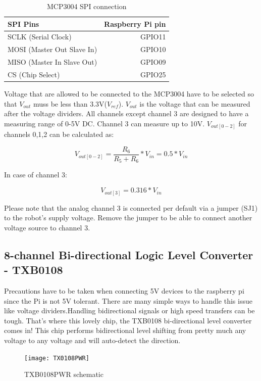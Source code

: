 \documentclass[
12pt, %
a4paper, %
oneside, %
headinclude,footinclude, %
BCOR5mm, %
table,
]{scrartcl}
\begin{document}
\begin{table}[H]
\centering
\begin{tabular}{lr}
\hline
SPI Pins & Raspberry Pi pin \\
\hline
SCLK (Serial Clock)        & GPIO11 \\
MOSI (Master Out Slave In) & GPIO10 \\
MISO (Master In Slave Out) & GPIO09 \\
CS   (Chip Select)         & GPIO25 \\
\hline
\end{tabular}
\label{tab:label}
\caption{MCP3004 SPI connection}
\end{table}
Voltage that are allowed to be connected to the MCP3004 have to be selected so that \(V_{out}\) muss be less than 3.3V(\(V_{ref}\)). \(V_{out}\) is the voltage that can be measured after the voltage dividers. All channels except channel 3 are designed to have a measuring range of 0-5V DC. Channel 3 can measure up to 10V.
\(V_{out[0-2]}\) for channels 0,1,2 can be calculated as:

\[ V_{ out[0-2] } = \frac{ R_{6} }{ R_{5} + R_{6} } * V_{in}  = 0.5* V_{in}\]

In case of channel 3:

\[ V_{out[3]} = 0.316 * V_{in}\]

Please note that the analog channel 3 is connected per default via a jumper (SJ1) to the robot's supply voltage. Remove the jumper to be able to connect another voltage source to channel 3. 

\subsection{8-channel Bi-directional Logic Level Converter - TXB0108}
Precautions have to be taken when connecting 5V devices to the raspberry pi since the Pi is not 5V tolerant. There are many simple ways to handle this issue like voltage dividers.Handling bidirectional signals or high speed transfers can be tough. That's where this lovely chip, the TXB0108 bi-directional level converter comes in! This chip performs bidirectional level shifting from pretty much any voltage to any voltage and will auto-detect the direction.  

\begin{figure}[h]
\centering
\texttt{[image: TX0108PWR]} 
\caption[TX0108PWR schematic]{TXB0108PWR schematic}
\label{fig:TX0108PWR}
\end{figure}
\end{document}
